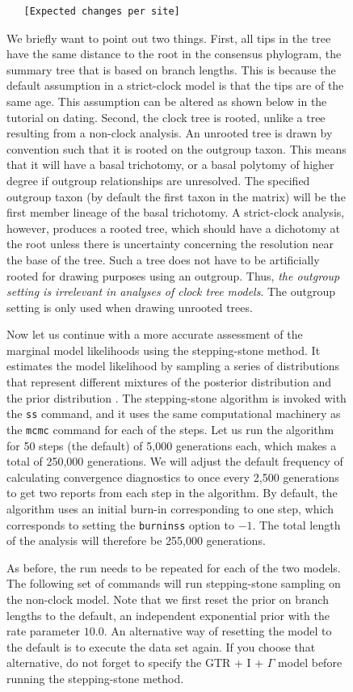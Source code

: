 \documentclass[12pt]{book}
\newcommand{\ttt}[1]{\texttt{#1}}
\begin{document}
\begin{figure}[h]
\begin{singlespacing}
\begin{verbatim}
   [Expected changes per site]
\end{verbatim}
\normalsize
\end{singlespacing}

We briefly want to point out two things. First, all tips in the tree have the same distance to the
root in the consensus phylogram, the summary tree that is based on branch lengths. This is because
the default assumption in a strict-clock model is that the tips are of the same age. This
assumption can be altered as shown below in the tutorial on dating. Second, the clock tree is
rooted, unlike a tree resulting from a non-clock analysis. An unrooted tree is drawn by convention
such that it is rooted on the outgroup taxon. This means that it will have a basal trichotomy, or a
basal polytomy of higher degree if outgroup relationships are unresolved. The specified outgroup
taxon (by default the first taxon in the matrix) will be the first member lineage of the basal
trichotomy. A strict-clock analysis, however, produces a rooted tree, which should have a dichotomy
at the root unless there is uncertainty concerning the resolution near the base of the tree. Such a
tree does not have to be artificially rooted for drawing purposes using an outgroup.  Thus,
\emph{the outgroup setting is irrelevant in analyses of clock tree models}. The outgroup setting is
only used when drawing unrooted trees.

Now let us continue with a more accurate assessment of the marginal model likelihoods using the
stepping-stone method. It estimates the model likelihood by sampling a series of distributions that
represent different mixtures of the posterior distribution and the prior distribution
\citep{xie11}. The stepping-stone algorithm is invoked with the \ttt{ss} command, and it uses the
same computational machinery as the \ttt{mcmc} command for each of the steps. Let us run the
algorithm for 50 steps (the default) of 5,000 generations each, which makes a total of 250,000
generations. We will adjust the default frequency of calculating convergence diagnostics to once
every 2,500 generations to get two reports from each step in the algorithm. By default, the
algorithm uses an initial burn-in corresponding to one step, which corresponds to setting the
\ttt{burninss} option to $-1$. The total length of the analysis will therefore be 255,000
generations.

As before, the run needs to be repeated for each of the two models. The following set of commands
will run stepping-stone sampling on the non-clock model. Note that we first reset the prior on
branch lengths to the default, an independent exponential prior with the rate parameter $10.0$. An
alternative way of resetting the model to the default is to execute the data set again. If you
choose that alternative, do not forget to specify the GTR + I + $\Gamma$ model before running the
stepping-stone method.


\end{figure}
\end{document}
